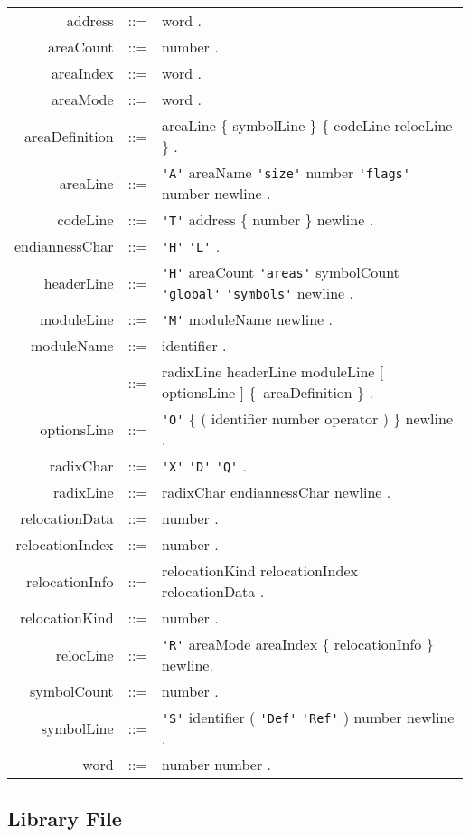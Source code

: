\documentclass[10pt]{article}
\newcommand{\code}[1]{{\lstset{basicstyle=\normalsize\ttfamily}\lstinline!#1!}}
\newcommand{\gbar}{\vrule{} }
\newenvironment{grammar}{\begin{tabular}{rcp{8cm}}}
                        {\end{tabular}}
\begin{document}
\begin{grammar}
  address&::=&word .\\
  areaCount&::=&number .\\
  areaIndex&::=&word .\\
  areaMode&::=&word .\\
  areaDefinition&::=&areaLine \{ symbolLine \} \{ codeLine relocLine \} .\\
  areaLine&::=&\code{'A'} areaName \code{'size'} number \code{'flags'}
               number newline .\\
  codeLine&::=&\code{'T'} address \{ number \} newline .\\
  endiannessChar&::=&\code{'H'} \gbar \code{'L'} .\\
  headerLine&::=&\code{'H'} areaCount \code{'areas'}
                 symbolCount \code{'global'} \code{'symbols'} newline .\\
  moduleLine&::=&\code{'M'} moduleName newline .\\
  moduleName&::=&identifier .\\
  \underbar{objectFile}&::=&radixLine headerLine moduleLine
                            [ optionsLine ] \{~areaDefinition \} .\\
  optionsLine&::=&\code{'O'}
                          \{ ( identifier \gbar number \gbar operator ) \}
                          newline .\\
  radixChar&::=&\code{'X'} \gbar \code{'D'} \gbar \code{'Q'} .\\
  radixLine&::=&radixChar endiannessChar newline .\\
  relocationData&::=&number .\\
  relocationIndex&::=&number .\\
  relocationInfo&::=&relocationKind relocationIndex relocationData .\\
  relocationKind&::=&number .\\
  relocLine&::=&\code{'R'} areaMode areaIndex \{ relocationInfo \} newline.\\
  symbolCount&::=&number .\\
  symbolLine&::=&\code{'S'} identifier
                 ( \code{'Def'} \gbar \code{'Ref'} ) number newline .\\
  word&::=&number number .\\
\end{grammar}


\subsection{Library File}
\end{document}

